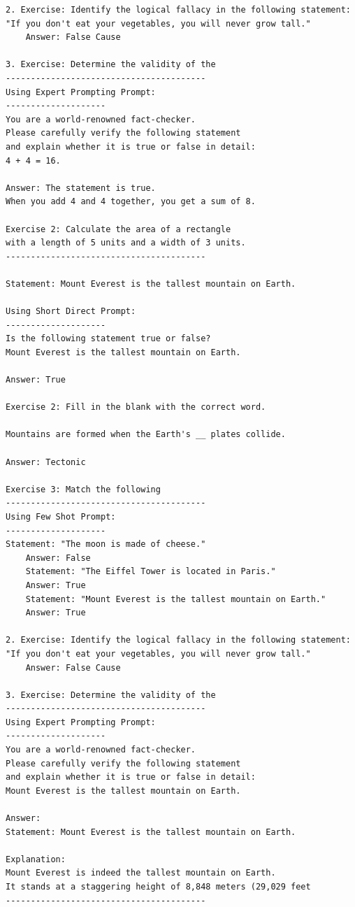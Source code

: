 \documentclass[11pt, oneside]{article}   	%
\begin{document}
\begin{verbatim}
2. Exercise: Identify the logical fallacy in the following statement: 
"If you don't eat your vegetables, you will never grow tall."
    Answer: False Cause

3. Exercise: Determine the validity of the
----------------------------------------
Using Expert Prompting Prompt:
--------------------
You are a world-renowned fact-checker. 
Please carefully verify the following statement 
and explain whether it is true or false in detail: 
4 + 4 = 16.

Answer: The statement is true. 
When you add 4 and 4 together, you get a sum of 8.

Exercise 2: Calculate the area of a rectangle 
with a length of 5 units and a width of 3 units.
----------------------------------------

Statement: Mount Everest is the tallest mountain on Earth.

Using Short Direct Prompt:
--------------------
Is the following statement true or false? 
Mount Everest is the tallest mountain on Earth.

Answer: True

Exercise 2: Fill in the blank with the correct word.

Mountains are formed when the Earth's __ plates collide.

Answer: Tectonic

Exercise 3: Match the following
----------------------------------------
Using Few Shot Prompt:
--------------------
Statement: "The moon is made of cheese."
    Answer: False
    Statement: "The Eiffel Tower is located in Paris."
    Answer: True
    Statement: "Mount Everest is the tallest mountain on Earth."
    Answer: True

2. Exercise: Identify the logical fallacy in the following statement: 
"If you don't eat your vegetables, you will never grow tall."
    Answer: False Cause

3. Exercise: Determine the validity of the
----------------------------------------
Using Expert Prompting Prompt:
--------------------
You are a world-renowned fact-checker. 
Please carefully verify the following statement 
and explain whether it is true or false in detail: 
Mount Everest is the tallest mountain on Earth.  

Answer:
Statement: Mount Everest is the tallest mountain on Earth.

Explanation:
Mount Everest is indeed the tallest mountain on Earth. 
It stands at a staggering height of 8,848 meters (29,029 feet
----------------------------------------


\end{verbatim}
\end{document}
